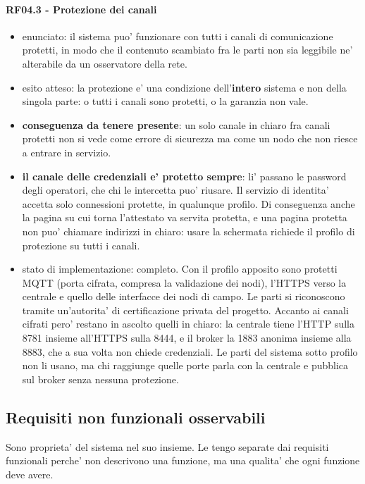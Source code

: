 \documentclass[11pt]{article}
\begin{document}
\paragraph{RF04.3 - Protezione dei canali}
\label{sec:org6bd073c}
\begin{itemize}
\item enunciato: il sistema puo' funzionare con tutti i canali di comunicazione protetti, in modo che il
contenuto scambiato fra le parti non sia leggibile ne' alterabile da un osservatore della rete.
\item esito atteso: la protezione e' una condizione dell'\textbf{intero} sistema e non della singola parte: o
tutti i canali sono protetti, o la garanzia non vale.
\item \textbf{conseguenza da tenere presente}: un solo canale in chiaro fra canali protetti non si vede come
errore di sicurezza ma come un nodo che non riesce a entrare in servizio.
\item \textbf{il canale delle credenziali e' protetto sempre}: li' passano le password degli operatori, che
chi le intercetta puo' riusare. Il servizio di identita' accetta solo connessioni protette, in
qualunque profilo. Di conseguenza anche la pagina su cui torna l'attestato va servita protetta, e
una pagina protetta non puo' chiamare indirizzi in chiaro: usare la schermata richiede il profilo
di protezione su tutti i canali.
\item stato di implementazione: completo. Con il profilo apposito sono protetti MQTT (porta cifrata,
compresa la validazione dei nodi), l'HTTPS verso la centrale e quello delle interfacce dei nodi di
campo. Le parti si riconoscono tramite un'autorita' di certificazione privata del progetto.
Accanto ai canali cifrati pero' restano in ascolto quelli in chiaro: la centrale tiene l'HTTP
sulla 8781 insieme all'HTTPS sulla 8444, e il broker la 1883 anonima insieme alla 8883, che a sua
volta non chiede credenziali. Le parti del sistema sotto profilo non li usano, ma chi raggiunge
quelle porte parla con la centrale e pubblica sul broker senza nessuna protezione.
\end{itemize}
\subsection{Requisiti non funzionali osservabili}
\label{sec:org9c702f6}

Sono proprieta' del sistema nel suo insieme. Le tengo separate dai requisiti funzionali perche' non
descrivono una funzione, ma una qualita' che ogni funzione deve avere.
\end{document}
